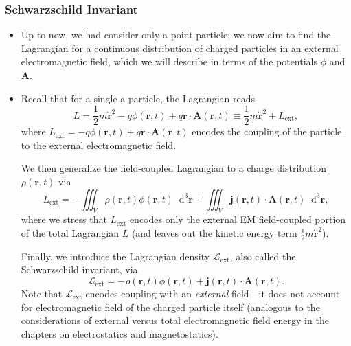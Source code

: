 \documentclass[11pt, a4paper]{article}
\newcommand{\diff}{\mathop{}\!\mathrm{d}} %
\newcommand{\dr}{\diff^{3} \r}  %
\renewcommand{\L}{\mathcal{L}}  %
\renewcommand{\vec}[1]{\bm{#1}} %
\newcommand{\bdot}[1]{\dot{\vec{#1}}}
\renewcommand{\r}{\vec{r}}
\newcommand{\A}{\vec{A}} %
\renewcommand{\j}{\vec{j}}  %
\begin{document}
\subsubsection{Schwarzschild Invariant}
\begin{itemize}
	\item Up to now, we had consider only a point particle; we now aim to find the Lagrangian for a continuous distribution of charged particles in an external electromagnetic field, which we will describe in terms of the potentials $ \phi $ and $ \A $. 
	
	\item Recall that for a single a particle, the Lagrangian reads
	\begin{equation*}
		L = \frac{1}{2}m\bdot{r}^{2} - q \phi(\r, t) + q \bdot{r}\cdot \A(\r, t) \equiv \frac{1}{2}m \dot{\vec{r}}^{2} + L_{\text{ext}},
	\end{equation*}
    where $ L_{\text{ext}} = - q \phi(\r, t) + q \bdot{r}\cdot \A(\r, t) $ encodes the coupling of the particle to the external electromagnetic field. 

    We then generalize the field-coupled Lagrangian to a charge distribution $ \rho(\r, t) $ via
	\begin{equation*}
		L_{\text{ext}} = - \iiint_{V}\rho(\r, t) \phi(\r, t) \dr + \iiint_{V}\j(\r, t) \cdot \A(\r, t)\dr,
	\end{equation*}
    where we stress that $ L_{\text{ext}} $ encodes only the external EM field-coupled portion of the total Lagrangian $ L $ (and leaves out the kinetic energy term $ \frac{1}{2}m \dot{\vec{r}}^{2} $).
    
    Finally, we introduce the Lagrangian density $ \L_{\text{ext}} $, also called the Schwarzschild invariant, via
	\begin{equation*}
		\L_{\text{ext}} = - \rho(\r, t) \phi(\r, t) + \j(\r, t)\cdot \A(\r, t).
	\end{equation*}
    Note that $ \L_{\text{ext}} $ encodes coupling with an \textit{external} field---it does not account for electromagnetic field of the charged particle itself (analogous to the considerations of external versus total electromagnetic field energy in the chapters on electrostatics and magnetostatics).
	
\end{itemize}
\end{document}
